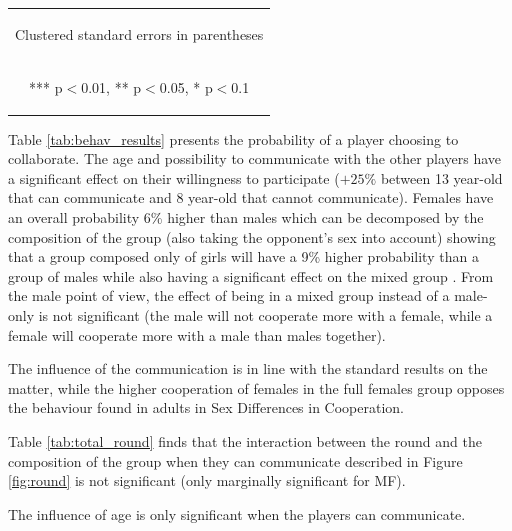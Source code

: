 \documentclass{article} %
\begin{document}
\begin{table}[H]
\begin{center}
\begin{tabular}{lcccc}
\multicolumn{5}{c}{\begin{footnotesize} Clustered standard errors in parentheses\end{footnotesize}} \\
\multicolumn{5}{c}{\begin{footnotesize} *** p$<$0.01, ** p$<$0.05, * p$<$0.1\end{footnotesize}} \\
\end{tabular}
\end{center}


\end{table}

Table \ref{tab:behav_results} presents the  probability of a player choosing to collaborate. The age and possibility to communicate with the other players have a significant effect on their willingness to participate ($+25\%$ between 13 year-old that can communicate and 8 year-old that cannot communicate).
Females have an overall probability 6\% higher than males which can be decomposed by the composition of the group (also taking the opponent's sex into account) showing that a group composed only of girls will have a 9\% higher probability than a group of males while also having a significant effect on the mixed group . From the male point of view, the effect of being in a mixed group instead of a male-only is not significant (the male will not cooperate more with a female, while a female will cooperate more with a male than males together).

The influence of the communication is in line with the standard results on the matter, while the higher cooperation of females in the full females group opposes the behaviour found in adults in Sex Differences in Cooperation. 

\vspace{1.5 cm}

Table \ref{tab:total_round} finds that the interaction between the round and the composition of the group when they can communicate described in Figure \ref{fig:round} is not significant (only marginally significant for MF).

The influence of age is only significant when the players can communicate.
\end{document}
